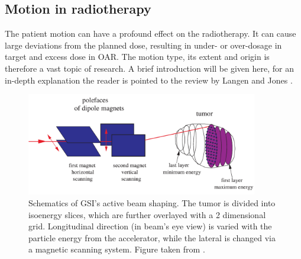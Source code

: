 \subsection{Motion in radiotherapy}
\label{sec:motion}

The patient motion can have a profound effect on the radiotherapy. It can cause large deviations from the planned dose, resulting in under- or over-dosage in target and excess dose in OAR. The motion type, its extent and origin is therefore a vast topic of research. 
A brief introduction will be given here, for an in-depth explanation the reader is pointed to the review by Langen and Jones \cite{Langen2001}.

\newpage

\vspace*{0.6cm}

\begin{figure}[H]
\begin{center}
\includegraphics[width=0.9\textwidth]{./Fundamentals/Images/therapy.png}
\caption{Schematics of GSI's active beam shaping. The tumor is divided into isoenergy slices, which are further overlayed with a 2 dimensional grid. 
Longitudinal direction (in beam's eye view) is varied with the particle energy from the accelerator, while the lateral is changed via a magnetic scanning system. Figure taken from \cite{Kraemer2009}.}
\label{scanning}
\end{center}
\end{figure}


